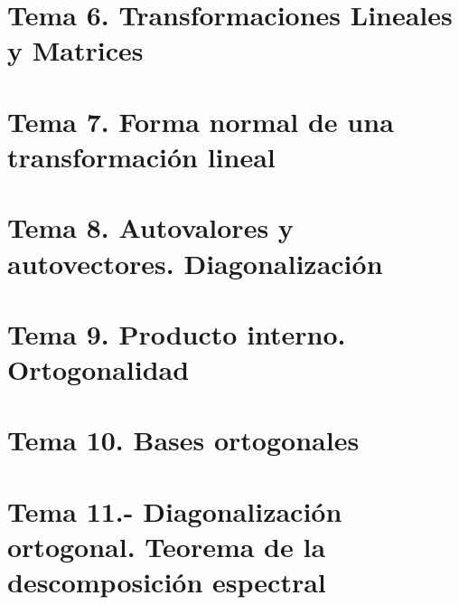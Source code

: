 \documentclass[12pt]{report} %
\begin{document}
\part{Tema 6. Transformaciones Lineales y Matrices}




\part{Tema 7. Forma normal de una transformación lineal}




\part{Tema 8. Autovalores  y autovectores. Diagonalización}






\part{Tema 9. Producto interno. Ortogonalidad}





\part{Tema 10. Bases ortogonales}




\part{Tema 11.- Diagonalización ortogonal. Teorema de la descomposición espectral}




\end{document}
